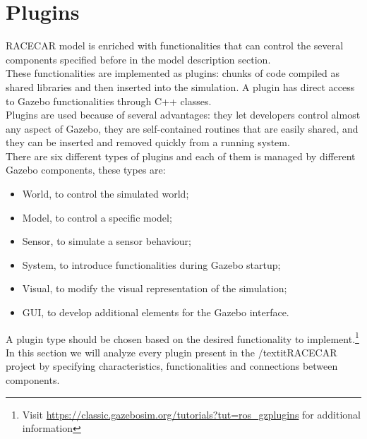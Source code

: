 \section{Plugins}
RACECAR model is enriched with functionalities that can control the several components specified before in the 
model description section.\\
These functionalities are implemented as plugins: chunks of code compiled as shared libraries 
and then inserted into the simulation. A plugin has direct access to Gazebo functionalities through C++ classes.\\
Plugins are used because of several advantages: they let developers control almost any aspect of Gazebo,
they are self-contained routines that are easily shared, and they can be inserted and removed quickly from a running system.\\
There are six different types of plugins and each of them is managed by different Gazebo components, these types are:
\begin{itemize}
    \item World, to control the simulated world;
    \item Model, to control a specific model;
    \item Sensor, to simulate a sensor behaviour;
    \item System, to introduce functionalities during Gazebo startup;
    \item Visual, to modify the visual representation of the simulation;
    \item GUI, to develop additional elements for the Gazebo interface.
\end{itemize}
A plugin type should be chosen based on the desired functionality to implement.\footnote{Visit 
\url{https://classic.gazebosim.org/tutorials?tut=ros_gzplugins} for additional information}\\
In this section we will analyze every plugin present in the /textit{RACECAR project} by specifying characteristics, 
functionalities and connections between components.

